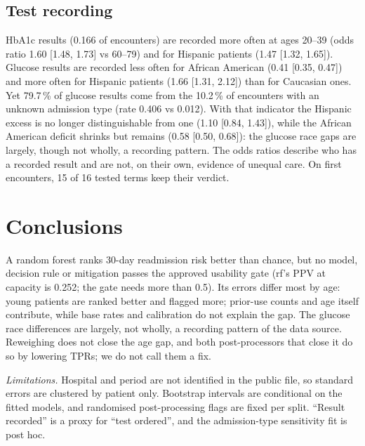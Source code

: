 \documentclass[conference]{IEEEtran}
\begin{document}
\subsection{Test recording}
HbA1c results (0.166 of encounters) are recorded more often at ages 20--39 (odds ratio 1.60
[1.48, 1.73] vs 60--79) and for Hispanic patients (1.47 [1.32, 1.65]). %
Glucose results are recorded less often for African American (0.41 [0.35, 0.47]) and more often
for Hispanic patients (1.66 [1.31, 2.12]) than for Caucasian ones. %
Yet 79.7\,\% of glucose results come from the 10.2\,\% of encounters with an unknown admission type
(rate 0.406 vs 0.012). %
With that indicator the Hispanic excess is no longer distinguishable from one (1.10 [0.84, 1.43]),
while the African American deficit shrinks but remains (0.58 [0.50, 0.68]): the glucose race gaps
are largely, though not wholly, a recording pattern. The odds ratios describe who has a recorded
result and are not, on their own, evidence of unequal care. %
On first encounters, 15 of 16 tested terms keep their verdict. %

\section{Conclusions}

A random forest ranks 30-day readmission risk better than chance, but no model, decision rule or
mitigation passes the approved usability gate (rf's PPV at capacity is 0.252; the gate needs more
than 0.5). %
Its errors differ most by age: young patients are ranked better and flagged more; prior-use
counts and age itself contribute, while base rates and calibration do not explain the gap.
The glucose race differences are largely, not wholly, a recording pattern of the data source.
Reweighing does not close the age gap, and both post-processors that close it do so by lowering
TPRs; we do not call them a fix.

\emph{Limitations.} Hospital and period are not identified in the public file, so standard errors
are clustered by patient only. Bootstrap intervals are conditional on the fitted models, and randomised post-processing flags are fixed per
split. ``Result recorded'' is a proxy for ``test ordered'', and the admission-type sensitivity fit
is post hoc.
\end{document}
